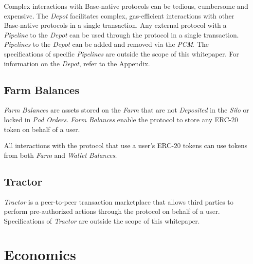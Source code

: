 \documentclass[tikz]{article}
\newcommand{\term}[1]{\textsl{#1}}
\begin{document}
Complex interactions with Base-native protocols can be tedious, cumbersome and expensive. The \term{Depot} facilitates complex, gas-efficient interactions with other Base-native protocols in a single transaction. Any external protocol with a \term{Pipeline} to the \term{Depot} can be used through the protocol in a single transaction. \term{Pipelines} to the \term{Depot} can be added and removed via the \term{PCM}. The specifications of specific \term{Pipelines} are outside the scope of this whitepaper. For information on the \term{Depot}, refer to the Appendix.


\vspace{0.1cm}
\subsection{Farm Balances}
\vspace{0.1cm}

\term{Farm Balances} are assets stored on the \term{Farm} that are not \term{Deposited} in the \term{Silo} or locked in \term{Pod Orders}. \term{Farm Balances} enable the protocol to store any ERC-20 token on behalf of a user.

All interactions with the protocol that use a user's ERC-20 tokens can use tokens from both \term{Farm} and \term{Wallet Balances}.


\vspace{0.1cm}
\subsection{Tractor}
\vspace{0.1cm}

\term{Tractor} is a peer-to-peer transaction marketplace that allows third parties to perform pre-authorized actions through the protocol on behalf of a user. Specifications of \term{Tractor} are outside the scope of this whitepaper.


\vspace{0.1cm}
\section{Economics}
\vspace{0.1cm}
\end{document}
